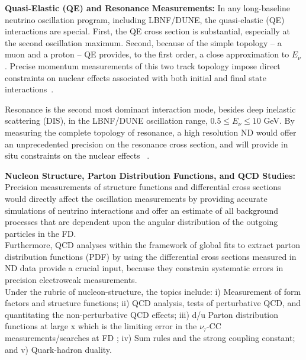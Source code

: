 \vspace{0.25cm} 
\noindent 
{\bf Quasi-Elastic (QE) and Resonance Measurements:}  
In any long-baseline neutrino oscillation program, including LBNF/DUNE, 
the quasi-elastic (QE) interactions are special. First, the QE cross section is substantial, especially at the second oscillation maximum. 
Second, because of the simple topology -- a muon and a proton -- QE provides, to the first order, 
a close approximation to $E_\nu$.  
Precise momentum measurements  of this two track topology impose direct constraints on nuclear effects 
associated with both initial and final state interactions~\cite{ND-QE}. 

Resonance is the second most dominant interaction mode, besides deep inelastic scattering (DIS),  
in the LBNF/DUNE oscillation range, $0.5 \leq E_\nu \leq 10$ GeV.
 By measuring the complete 
topology of resonance, a high resolution ND 
would offer an unprecedented precision on the resonance cross section, and will provide in situ constraints on the 
nuclear effects ~\cite{ND-RES}.  




\vspace{0.25cm} 
\noindent 
{\bf Nucleon Structure, Parton Distribution Functions, and QCD Studies:} 
Precision measurements of  structure functions and 
differential cross sections would directly affect the oscillation measurements 
by providing accurate simulations of neutrino interactions and offer an estimate of 
all background processes that are dependent upon the angular distribution of 
the outgoing particles in the FD. \\
Furthermore, QCD analyses within the framework of global fits to 
extract parton distribution functions (PDF) by using the differential cross sections 
measured in ND data provide a crucial input,  because they  constrain systematic errors in 
precision electroweak measurements.\\
Under the rubric of nucleon-structure, the topics include: i) Measurement of form factors and structure functions; ii) QCD analysis,  tests of perturbative QCD,  and quantitating the non-perturbative 
QCD effects; iii) d/u Parton distribution functions at large x which is the limiting error in the 
$\nu_\tau$-CC measurements/searches at FD ; iv) Sum rules and the strong coupling constant; and v) Quark-hadron duality. 
%
%
%

